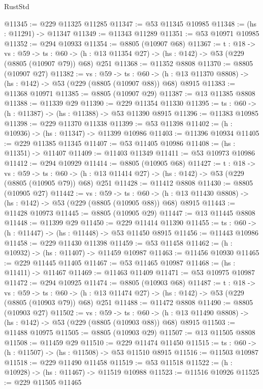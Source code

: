 \begin{lexlean}{RustStd}
\begin{coremodule}
@11345 := @229 @11325 @11285
@11347 := @53 @11345 @10985
@11348 := (hs : @11291) -> @11347
@11349 := @11343 @11289
@11351 := @53 @10971 @10985
@11352 := @294 @10933
@11354 := @8805 (@10907 @68)
@11367 := {t : @18} ->
  {vs : @59} ->
  {ts : @60} -> (h : @13 @11354 @27) -> (hs : @142) -> @53 (@229 (@8805 (@10907 @79)) @68) @251
@11368 := @11352 @8808
@11370 := @8805 (@10907 @27)
@11382 := {vs : @59} ->
  {ts : @60} -> (h : @13 @11370 @8808) -> (hs : @142) -> @53 (@229 (@8805 (@10907 @88)) @68) @8915
@11383 := @11368 @10971
@11385 := @8805 (@10907 @29)
@11387 := @13 @11385 @8808
@11388 := @11339 @29
@11390 := @229 @11354 @11330
@11395 := {ts : @60} -> (h : @11387) -> (hs : @11388) -> @53 @11390 @8915
@11396 := @11383 @10985
@11398 := @229 @11370 @11338
@11399 := @53 @11398
@11402 := (h : @10936) -> (hs : @11347) -> @11399 @10986
@11403 := @11396 @10934
@11405 := @229 @11385 @11345
@11407 := @53 @11405 @10986
@11408 := (hs : @11351) -> @11407
@11409 := @11403 @11349
@11411 := @53 @10973 @10986
@11412 := @294 @10929
@11414 := @8805 (@10905 @68)
@11427 := {t : @18} ->
  {vs : @59} ->
  {ts : @60} -> (h : @13 @11414 @27) -> (hs : @142) -> @53 (@229 (@8805 (@10905 @79)) @68) @251
@11428 := @11412 @8808
@11430 := @8805 (@10905 @27)
@11442 := {vs : @59} ->
  {ts : @60} -> (h : @13 @11430 @8808) -> (hs : @142) -> @53 (@229 (@8805 (@10905 @88)) @68) @8915
@11443 := @11428 @10973
@11445 := @8805 (@10905 @29)
@11447 := @13 @11445 @8808
@11448 := @11399 @29
@11450 := @229 @11414 @11390
@11455 := {ts : @60} -> (h : @11447) -> (hs : @11448) -> @53 @11450 @8915
@11456 := @11443 @10986
@11458 := @229 @11430 @11398
@11459 := @53 @11458
@11462 := (h : @10932) -> (hs : @11407) -> @11459 @10987
@11463 := @11456 @10930
@11465 := @229 @11445 @11405
@11467 := @53 @11465 @10987
@11468 := (hs : @11411) -> @11467
@11469 := @11463 @11409
@11471 := @53 @10975 @10987
@11472 := @294 @10925
@11474 := @8805 (@10903 @68)
@11487 := {t : @18} ->
  {vs : @59} ->
  {ts : @60} -> (h : @13 @11474 @27) -> (hs : @142) -> @53 (@229 (@8805 (@10903 @79)) @68) @251
@11488 := @11472 @8808
@11490 := @8805 (@10903 @27)
@11502 := {vs : @59} ->
  {ts : @60} -> (h : @13 @11490 @8808) -> (hs : @142) -> @53 (@229 (@8805 (@10903 @88)) @68) @8915
@11503 := @11488 @10975
@11505 := @8805 (@10903 @29)
@11507 := @13 @11505 @8808
@11508 := @11459 @29
@11510 := @229 @11474 @11450
@11515 := {ts : @60} -> (h : @11507) -> (hs : @11508) -> @53 @11510 @8915
@11516 := @11503 @10987
@11518 := @229 @11490 @11458
@11519 := @53 @11518
@11522 := (h : @10928) -> (hs : @11467) -> @11519 @10988
@11523 := @11516 @10926
@11525 := @229 @11505 @11465

\end{coremodule}
\end{lexlean}
